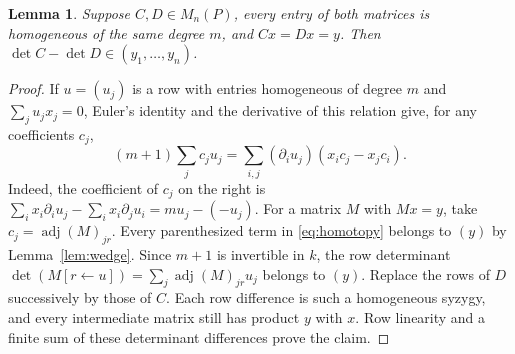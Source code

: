 \documentclass[11pt,letterpaper]{article}
\newtheorem{lemma}[theorem]{Lemma}
\DeclareMathOperator{\adj}{adj}
\begin{document}
\begin{lemma}\label{lem:comparison}
Suppose \(C,D\in M_n(P)\), every entry of both matrices is homogeneous of the
same degree \(m\), and \(Cx=Dx=y\). Then
\(\det C-\det D\in(y_1,\ldots,y_n)\).
\end{lemma}
\begin{proof}
If \(u=(u_j)\) is a row with entries homogeneous of degree \(m\) and
\(\sum_j u_jx_j=0\), Euler's identity and the derivative of this relation give,
for any coefficients \(c_j\),
\begin{equation}\label{eq:homotopy}
 (m+1)\sum_jc_ju_j
 =\sum_{i,j}(\partial_i u_j)(x_ic_j-x_jc_i).
\end{equation}
Indeed, the coefficient of \(c_j\) on the right is
\(\sum_i x_i\partial_i u_j-\sum_i x_i\partial_j u_i
 =mu_j-(-u_j)\).
For a matrix \(M\) with \(Mx=y\), take \(c_j=\adj(M)_{jr}\).
Every parenthesized term in \eqref{eq:homotopy} belongs to \((y)\) by
Lemma~\ref{lem:wedge}. Since \(m+1\) is invertible in \(k\), the row determinant
\(\det(M[r\leftarrow u])=\sum_j\adj(M)_{jr}u_j\) belongs to \((y)\).
Replace the rows of \(D\) successively by those of \(C\).
Each row difference is such a homogeneous syzygy, and every intermediate
matrix still has product \(y\) with \(x\). Row linearity and a finite sum of
these determinant differences prove the claim.
\end{proof}
\end{document}
